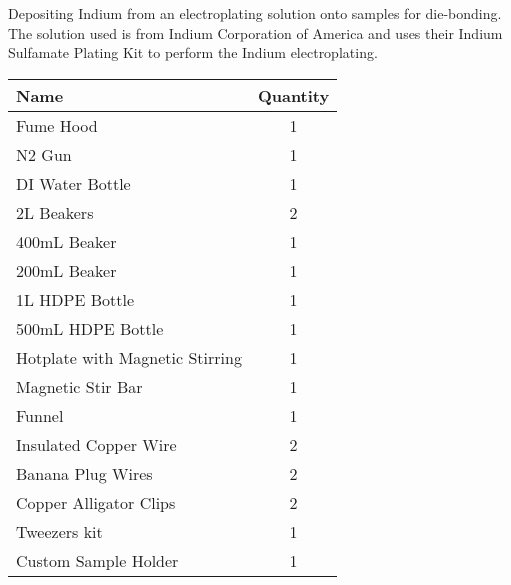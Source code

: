 
\begin{tcolorbox}
    [width=0.934\textwidth,
    colback={white},
    title={\textbf{Note}: Electroplating procedure used in the E3-3139 Lab},
    colbacktitle={purple4},
    coltitle=white,
    colframe={purple4},
    breakable]
    \raggedright %

    Depositing Indium from an electroplating solution onto samples for die-bonding. The solution used is from Indium Corporation of America and uses their Indium Sulfamate Plating Kit to perform the Indium electroplating.

    \begin{center}

    \begin{tabular}{|l|c|}
        \hline
        \textbf{Name}  &   \textbf{Quantity} \\
        \hline
        Fume Hood                           &	1 \\
        N2 Gun                              &	1 \\
        DI Water Bottle                     &	1 \\
        2L Beakers                          &	2 \\
        400mL Beaker                        &	1 \\
        200mL Beaker                        &	1 \\
        1L HDPE Bottle                      &	1 \\
        500mL HDPE Bottle                   &	1 \\
        Hotplate with Magnetic Stirring     &	1 \\
        Magnetic Stir Bar                   &   1 \\
        Funnel                              &	1 \\
        Insulated Copper Wire               &	2 \\
        Banana Plug Wires                   &	2 \\
        Copper Alligator Clips              &	2 \\
        Tweezers kit                        &	1 \\
        Custom Sample Holder                &	1 \\
        \hline
    \end{tabular}

    \vspace{0.5cm}


\end{center}
\end{tcolorbox}
